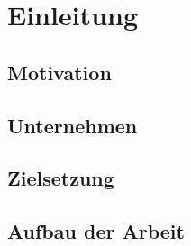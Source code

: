 \section{Einleitung}
\subsection{Motivation}
\subsection{Unternehmen}
\subsection{Zielsetzung}
\subsection{Aufbau der Arbeit}

